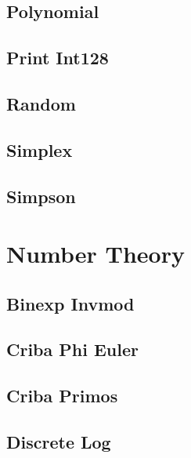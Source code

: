 \documentclass[10pt,portrait,twocolumn,a4paper,notitlepage]{article}
\newcommand\cppfile[2][]{%
\ifstrempty{#1}{}{}%
}
\begin{document}
\subsection{Polynomial}
\cppfile{math_clean/polynomial.cpp}

\subsection{Print Int128}
\cppfile{math_clean/print_int128.cpp}

\subsection{Random}
\cppfile{math_clean/random.cpp}

\subsection{Simplex}
\cppfile{math_clean/simplex.cpp}

\subsection{Simpson}
\cppfile{math_clean/simpson.cpp}


\section{Number Theory}

\subsection{Binexp Invmod}
\cppfile{number_theory_clean/binexp_invmod.cpp}

\subsection{Criba Phi Euler}
\cppfile{number_theory_clean/criba_phi_euler.cpp}

\subsection{Criba Primos}
\cppfile{number_theory_clean/criba_primos.cpp}

\subsection{Discrete Log}
\cppfile{number_theory_clean/discrete_log.cpp}
\end{document}
